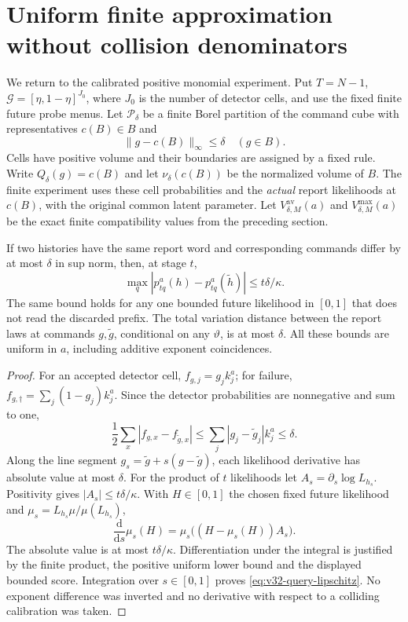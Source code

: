 \section{Uniform finite approximation without collision denominators}
\label{sec:v32-approximation}

We return to the calibrated positive monomial experiment. Put $T=N-1$,
$\mathcal G=[\eta,1-\eta]^{J_0}$, where $J_0$ is the number of detector cells, and use the fixed finite future probe menus.
Let $\mathcal P_\delta$ be a finite Borel partition of the command cube
with representatives $c(B)\in B$ and
\[
 \|g-c(B)\|_\infty\le\delta\quad(g\in B).
\]
Cells have positive volume and their boundaries are assigned by a fixed
rule. Write $Q_\delta(g)=c(B)$ and let $\nu_\delta(c(B))$ be the
normalized volume of $B$. The finite experiment uses these cell
probabilities and the \emph{actual} report likelihoods at $c(B)$, with
the original common latent parameter. Let
$V^{\mathrm{av}}_{\delta,M}(a)$ and
$V^{\max}_{\delta,M}(a)$ be the exact finite compatibility values from
the preceding section.

\begin{lemma}\label{lem:v32-perturbation}
If two histories have the same report word and corresponding commands
differ by at most $\delta$ in sup norm, then, at stage $t$,
\begin{equation}\label{eq:v32-query-lipschitz}
 \max_q|p^a_{tq}(h)-p^a_{tq}(\widetilde h)|
                       \le t\delta/\kappa.
\end{equation}
The same bound holds for any one bounded future likelihood in $[0,1]$
that does not read the discarded prefix. The total variation distance
between the report laws at commands $g,\widetilde g$, conditional on
any $\vartheta$, is at most $\delta$. All these bounds are uniform in
$a$, including additive exponent coincidences.
\end{lemma}
\begin{proof}
For an accepted detector cell,
$f_{g,j}=g_jk_j^a$; for failure,
$f_{g,\dagger}=\sum_j(1-g_j)k_j^a$. Since the detector probabilities
are nonnegative and sum to one,
\[
 \frac12\sum_x|f_{g,x}-f_{\widetilde g,x}|
 \le \sum_j|g_j-\widetilde g_j|k_j^a\le\delta.
\]
Along the line segment $g_s=\widetilde g+s(g-\widetilde g)$, each
likelihood derivative has absolute value at most $\delta$. For the
product of $t$ likelihoods let
$A_s=\partial_s\log L_{h_s}$. Positivity gives
$|A_s|\le t\delta/\kappa$. With $H\in[0,1]$ the chosen fixed future
likelihood and $\mu_s=L_{h_s}\mu/\mu(L_{h_s})$,
\[
 \frac{\mathrm d}{\mathrm ds}\mu_s(H)
       =\mu_s\bigl((H-\mu_s(H))A_s\bigr).
\]
The absolute value is at most $t\delta/\kappa$. Differentiation under
the integral is justified by the finite product, the positive uniform
lower bound and the displayed bounded score. Integration over $s\in[0,1]$
proves \eqref{eq:v32-query-lipschitz}. No exponent difference was inverted
and no derivative with respect to a colliding calibration was taken.
\end{proof}

